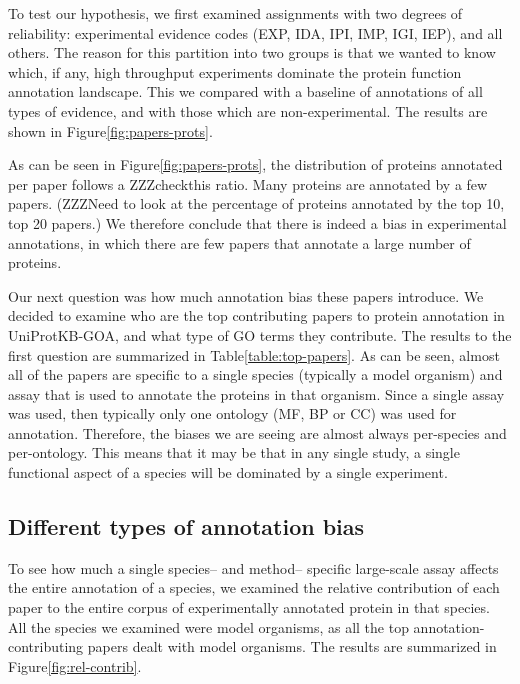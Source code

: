 \documentclass[10pt]{bmc_article}
\newenvironment{bmcformat}{\begin{raggedright}\baselineskip20pt\sloppy\setboolean{publ}{false}}{\end{raggedright}\baselineskip20pt\sloppy}
\begin{document}
\begin{bmcformat}
To test our hypothesis, we first examined assignments with two degrees of reliability:
experimental evidence codes (EXP, IDA, IPI, IMP, IGI, IEP), and all others. The
reason for this partition into two groups is that we wanted to know which, if
any, high throughput experiments dominate the protein function annotation
landscape. This we compared with a baseline of annotations of all types of
evidence, and with those which are non-experimental. The results are shown in
Figure\ref{fig:papers-prots}.

As can be seen in Figure\ref{fig:papers-prots}, the distribution of proteins
annotated per paper follows a  ZZZcheckthis ratio.  Many proteins are annotated by a
few papers. (ZZZNeed to look at the percentage of proteins annotated by the top
10, top 20 papers.) We therefore conclude that there is indeed a bias in
experimental annotations, in which there are few papers that annotate a large
number of proteins.

Our next question was how much annotation bias these papers introduce. We
decided to examine who are the top contributing papers to protein annotation in
UniProtKB-GOA, and what type of GO terms they contribute.  The results to the
first question are summarized in Table\ref{table:top-papers}.  As can be seen,
almost all of the papers are specific to a single species (typically a model
organism) and assay that is used to annotate the proteins in that organism.
Since a single assay was used, then typically only one ontology (MF, BP or CC)
was used for annotation. Therefore, the biases we are seeing are almost always per-species
and per-ontology.  This means that it may be that in any single study, a single functional
aspect of a species will be dominated by a single experiment.
 
\subsection*{Different types of annotation bias}
To see how much a single species-- and method-- specific large-scale assay
affects the entire annotation of a species, we examined the relative contribution
of each paper to the entire corpus of experimentally annotated protein in that species.
All the species we examined were model organisms, as all the top annotation-contributing papers
dealt with model organisms. 
The results are summarized in Figure\ref{fig:rel-contrib}.



\end{bmcformat}
\end{document}
